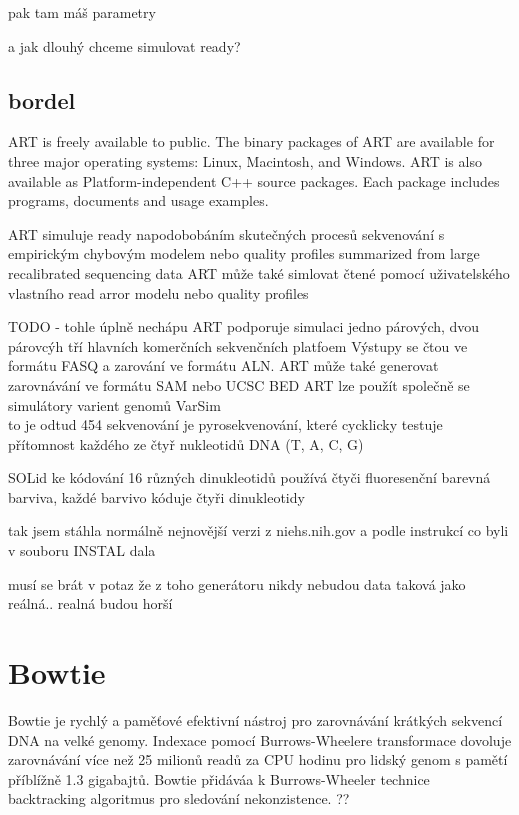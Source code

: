 \documentclass[czech,DP]{thesiskiv}
\begin{document}
pak tam máš parametry 

a jak dlouhý chceme simulovat ready? 



\subsection{bordel}
ART is freely available to public. The binary packages of ART are available for three major operating systems: Linux, Macintosh, and Windows. ART is also available as Platform-independent C++ source packages. Each package includes programs, documents and usage examples.

ART simuluje ready napodobobáním skutečných procesů sekvenování s empirickým chybovým modelem nebo quality profiles summarized from large recalibrated sequencing data
ART může také simlovat čtené pomocí uživatelského vlastního read arror modelu nebo quality profiles

TODO - tohle úplně nechápu ART podporuje simulaci jedno párových, dvou párovcýh tří hlavních komerčních sekvenčních platfoem 
Výstupy se čtou ve formátu FASQ a zarování ve formátu ALN. 
ART může také generovat zarovnávání ve formátu SAM nebo UCSC BED
ART lze použít společně se simulátory varient genomů VarSim 
\\
to je odtud %
454 sekvenování je pyrosekvenování, které cycklicky testuje přítomnost každého ze čtyř nukleotidů DNA (T, A, C, G)

SOLid ke kódování 16 různých dinukleotidů používá čtyči fluoresenční barevná barviva, každé barvivo kóduje čtyři dinukleotidy
 


tak jsem stáhla normálně nejnovější verzi z niehs.nih.gov a podle instrukcí co byli v souboru INSTAL dala %


musí se brát v potaz že z toho generátoru nikdy nebudou data taková jako reálná.. realná budou horší 




\section{Bowtie}
Bowtie je rychlý a paměťové efektivní nástroj pro zarovnávání krátkých sekvencí DNA na velké genomy. Indexace pomocí Burrows-Wheelere transformace dovoluje zarovnávání více než 25 milionů readů za CPU hodinu pro lidský genom s pamětí příblížně 1.3 gigabajtů. Bowtie přidáváa k Burrows-Wheeler technice backtracking algoritmus pro sledování nekonzistence. ??
\end{document}
